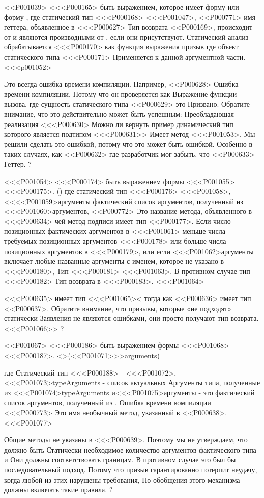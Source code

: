 {{{{{{{{{{{{<<P001039>
<<<P000165> быть выражением, которое имеет форму
или форму ,
где статический тип <<<P000168> <<<P001047>,
<<P000771> имя геттера, объявленное в <<<P000627> Тип возврата <<P000169>,
 происходит от  и
 являются производными от , если они присутствуют.
Статический анализ обрабатывается <<<P000170> как функция выражения призыв
где объект статического типа <<<P000171> Применяется к данной аргументной части.
<<<p001052>{%
Это всегда ошибка времени компиляции.
Например, <<P000628> Ошибка времени компиляции,
Потому что он проверяется как
Выражение функции вызова, где
сущность статического типа <<P000629> это
Призвано. Обратите внимание, что это действительно может быть успешным: Преобладающая реализация
<<<P000630> Можно ли вернуть пример
динамический тип которого является подтипом
<<<P000631>> Имеет метод <<<P001053>{}.
Мы решили сделать это ошибкой, потому что это может быть ошибкой.
Особенно в таких случаях, как <<P000632>
где разработчик мог забыть, что <<P000633> Геттер.%
?

<<<P001054>
<<<P000174> быть выражением формы <<<P001055>{<<<P000175>. \id()}
где статический тип <<<P000176> <<<P001058>, <<<<P001059>{аргументы}
фактический список аргументов, полученный из <<<P001060>{аргументов},
<<P000772> Это название метода, объявленного в <<<P000634>
чей метод подписи имеет тип <<P000177>.
Если число позиционных фактических аргументов в <<<P001061>
меньше числа требуемых позиционных аргументов <<<P000178>
или больше числа позиционных аргументов в <<<P000179>,
или если <<<P001062>{аргументы} включает любые названные аргументы
с именем, которое не указано в <<<P000180>,
Тип <<<P000181> <<<P001063>.
В противном случае тип <<<P000182> Тип возврата в <<<P000183>.
<<<P001064>{%
<<<P000635> имеет тип <<<P001065>< тогда как
<<P000636> имеет тип <<P000637>.
Обратите внимание, что призывы, которые «не подходят» статически
Заявления не являются ошибками, они просто получают тип возврата. <<<P001066>>%
?

<<P001067>
<<<P000186> быть выражением формы
<<<P001068><<<P000187>. \id<>(<<P001071>>>{arguments})} где
Статический тип <<<P000188> - <<<P001072>,
<<<P001073>{typeArguments} - список актуальных
Аргументы типа, полученные из <<<P001074>{typeArguments} и<<<P001075>{аргументы} - это фактический список аргументов, полученный из .
Ошибка времени компиляции <<<P000773> Это имя
необычный метод, указанный в <<P000638>.
<<<P001077>{%
Общие методы не указаны в <<<P000639>.
Поэтому мы не утверждаем, что должно быть
Статически необходимое количество аргументов фактического типа и
Они должны соответствовать границам.
В противном случае это был бы последовательный подход.
Потому что призыв гарантированно потерпит неудачу, когда любой из этих
нарушены требования,
Но обобщения этого механизма должны включать такие правила.
?

}}}}}}}}}}}}}}
